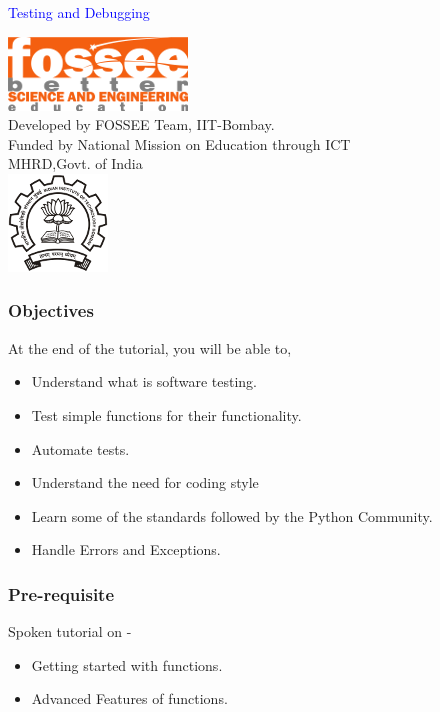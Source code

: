 \documentclass[presentation]{beamer}
\title{}
\author{FOSSEE}
\date{}
\begin{document}
\begin{frame}

\begin{center}
\vspace{12pt}
\textcolor{blue}{\huge Testing and Debugging}
\end{center}
\vspace{18pt}
\begin{center}
\vspace{10pt}
\includegraphics[scale=0.95]{../images/fossee-logo.png}\\
\vspace{5pt}
\scriptsize Developed by FOSSEE Team, IIT-Bombay. \\ 
\scriptsize Funded by National Mission on Education through ICT\\
\scriptsize  MHRD,Govt. of India\\
\includegraphics[scale=0.30]{../images/iitb-logo.png}\\
\end{center}
\end{frame}
\begin{frame}
\frametitle{Objectives}
\label{sec-2}

  At the end of the tutorial, you will be able to,


\begin{itemize}
\item Understand what is software testing.
\item Test simple functions for their functionality.
\item Automate tests.
\item Understand the need for coding style
\item Learn  some of the standards followed by the Python Community.
\item Handle Errors and Exceptions.
\end{itemize}
\end{frame}
\begin{frame}
\frametitle{Pre-requisite}
\label{sec-3}

Spoken tutorial on -

\begin{itemize}
\item Getting started with functions.
\item Advanced Features of functions.
\end{itemize}
\end{frame}
\end{document}
